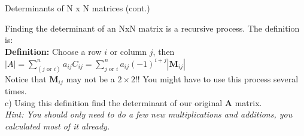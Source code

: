 \documentclass{article}
\begin{document}
\begin{flushleft}
\newpage
\LARGE \begin{center} Determinants of N x N matrices (cont.) \end{center} \normalsize
Finding the determinant of an NxN matrix is a recursive process. The definition is:\\
\vspace{0.1in}
\textbf{Definition:} Choose a row $i$ or column $j$, then $|A|=\sum\limits^{n}_{(j \text{ or } i)} a_{ij} C_{ij} = \sum\limits^{n}_{j \text{ or } i} a_{ij} (-1)^{i+j} |\textbf{M}_{ij}| $\\
\vspace{0.1in}
Notice that $\textbf{M}_{ij}$ may not be a $2 \times 2$!! You might have to use this process several times. \\
\vspace{0.1in}
c) Using this definition find the determinant of our original \textbf{A} matrix. \\
\textit{Hint: You should only need to do a few new multiplications and additions, you calculated most of it already.}\\
\vspace{1in}

\end{flushleft}
\end{document}

